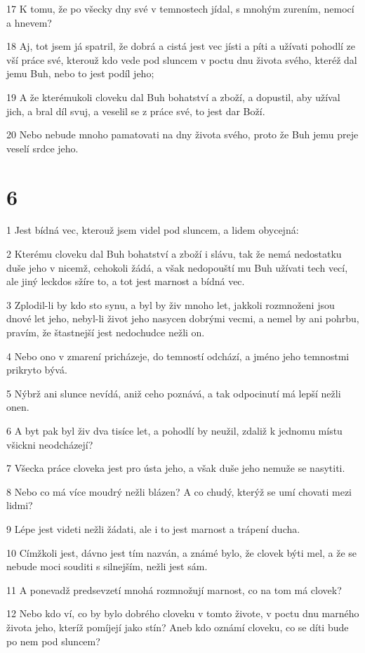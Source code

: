 \par 17 K tomu, že po všecky dny své v temnostech jídal, s mnohým zurením, nemocí a hnevem?
\par 18 Aj, tot jsem já spatril, že dobrá a cistá jest vec jísti a píti a užívati pohodlí ze vší práce své, kterouž kdo vede pod sluncem v poctu dnu života svého, kteréž dal jemu Buh, nebo to jest podíl jeho;
\par 19 A že kterémukoli cloveku dal Buh bohatství a zboží, a dopustil, aby užíval jich, a bral díl svuj, a veselil se z práce své, to jest dar Boží.
\par 20 Nebo nebude mnoho pamatovati na dny života svého, proto že Buh jemu preje veselí srdce jeho.

\chapter{6}

\par 1 Jest bídná vec, kterouž jsem videl pod sluncem, a lidem obycejná:
\par 2 Kterému cloveku dal Buh bohatství a zboží i slávu, tak že nemá nedostatku duše jeho v nicemž, cehokoli žádá, a však nedopouští mu Buh užívati tech vecí, ale jiný leckdos sžíre to, a tot jest marnost a bídná vec.
\par 3 Zplodil-li by kdo sto synu, a byl by živ mnoho let, jakkoli rozmnoženi jsou dnové let jeho, nebyl-li život jeho nasycen dobrými vecmi, a nemel by ani pohrbu, pravím, že štastnejší jest nedochudce nežli on.
\par 4 Nebo ono v zmarení pricházeje, do temností odchází, a jméno jeho temnostmi prikryto bývá.
\par 5 Nýbrž ani slunce nevídá, aniž ceho poznává, a tak odpocinutí má lepší nežli onen.
\par 6 A byt pak byl živ dva tisíce let, a pohodlí by neužil, zdaliž k jednomu místu všickni neodcházejí?
\par 7 Všecka práce cloveka jest pro ústa jeho, a však duše jeho nemuže se nasytiti.
\par 8 Nebo co má více moudrý nežli blázen? A co chudý, kterýž se umí chovati mezi lidmi?
\par 9 Lépe jest videti nežli žádati, ale i to jest marnost a trápení ducha.
\par 10 Címžkoli jest, dávno jest tím nazván, a známé bylo, že clovek býti mel, a že se nebude moci souditi s silnejším, nežli jest sám.
\par 11 A ponevadž predsevzetí mnohá rozmnožují marnost, co na tom má clovek?
\par 12 Nebo kdo ví, co by bylo dobrého cloveku v tomto živote, v poctu dnu marného života jeho, kteríž pomíjejí jako stín? Aneb kdo oznámí cloveku, co se díti bude po nem pod sluncem?

